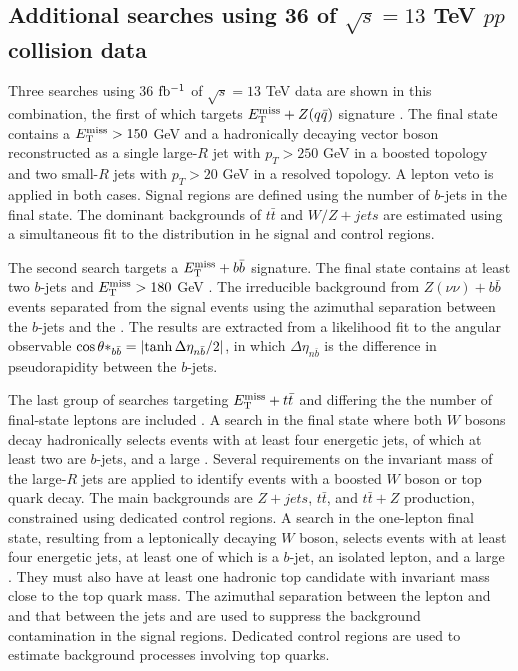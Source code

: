 \subsection{Additional searches using 36 \texorpdfstring{\ifb}{TEXT} of \texorpdfstring{$\sqrt{s}=13$}{TEXT} TeV \texorpdfstring{$pp$}{TEXT} collision data}

Three searches using 36 $\mbox{fb\(^{-1}\)}$ of $\sqrt{s}=13$ TeV data are shown in this combination, the first of which targets $E_{\mathrm{T}}^{\mathrm{miss}} + Z(q\bar{q})$ signature \cite{EXOT-2016-23}. The final state contains a $E_{\mathrm{T}}^{\mathrm{miss}}>150$ GeV and a hadronically decaying vector boson reconstructed as a single large-$R$ jet with $p_T>250$ GeV in a boosted topology and two small-$R$ jets with $p_T>20$ GeV in a resolved topology. A lepton veto is applied in both cases. Signal regions are defined using the number of $b$-jets in the final state. The dominant backgrounds of $t\bar{t}$ and $W/Z+jets$ are estimated using a simultaneous fit to the \met distribution in he signal and control regions.

The second search targets a $E_{\mathrm{T}}^{\mathrm{miss}}+b\bar{b}$ signature. The final state contains at least two $b$-jets and $E_{\mathrm{T}}^{\mathrm{miss}}>180$ GeV \cite{SUSY-2016-18}. The irreducible background from $Z(\nu\nu)+b\bar{b}$ events separated from the signal events using the azimuthal separation between the $b$-jets and the \met. The results are extracted from a likelihood fit to the angular observable $\cos\theta*_{b\bar{b}} = \abs{\tanh\Delta\eta_{n\bar{b}}/2}$, in which $\Delta\eta_{n\bar{b}}$ is the difference in pseudorapidity between the $b$-jets.

The last group of searches targeting $E_{\mathrm{T}}^{\mathrm{miss}}+t\bar{t}$ and differing the the number of final-state leptons are included \cite{SUSY-2016-18}. A search in the final state where both $W$ bosons decay hadronically selects events with at least four energetic jets, of which at least two are $b$-jets, and a large \met. Several requirements on the invariant mass of the large-$R$ jets are applied to identify events with a boosted $W$ boson or top quark decay. The main backgrounds are $Z+jets$, $t\bar{t}$, and $t\bar{t}+Z$ production, constrained using dedicated control regions. A search in the one-lepton final state, resulting from a leptonically decaying $W$ boson, selects events with at least four energetic jets, at least one of which is a $b$-jet, an isolated lepton, and a large \met \cite{SUSY-2016-16}. They must also have at least one hadronic top candidate with invariant mass close to the top quark mass. The azimuthal separation between the lepton and \met and that between the jets and \met are used to suppress the background contamination in the signal regions. Dedicated control regions are used to estimate background processes involving top quarks.

